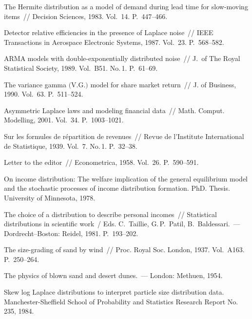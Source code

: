 \begin{multicols}{2}
{{\begin{thebibliography}{99}
The Hermite distribution as a model
of demand during lead time for slow-moving items~// Decision
Sciences, 1983. Vol.~14. P.~447--466.

Detector relative efficiencies in the presence
of Laplace noise~// IEEE Transactions in Aerospace
Electronic Systems, 1987. Vol.~23. P.~568--582.

ARMA models with double-exponentially
distributed noise~// J.\ of The Royal Statistical
Society, 1989. Vol.~B51. No.\,1. P.~61--69.

The variance gamma $($V.G.$)$ model for
share market return~// J. of Business, 1990. Vol.~63. P.~511--524.

Asymmetric Laplace laws and modeling
financial data~// Math. Comput. Modelling, 2001. Vol.~34. P.~1003--1021.

Sur les formules de r{\'e}partition de
revenues~// Revue de l'Institute International de
Statistique, 1939. Vol.~7. No.\,1. P.~32--38.

Letter to the editor~// Econometrica,
1958. Vol.~26. P.~590--591.

On income distribution: The welfare implication of the
general equilibrium model and the stochastic processes of income
distribution formation. PhD. Thesis. University of Minnesota,
1978.

The choice of a distribution to
describe personal incomes~//
Statistical distributions in scientific work~/
Eds. C.~Taillie, G.\,P.~Patil, B.~Baldessari.~---  Dordrecht--Boston: Reidel, 1981. P.~193--202.
 
The size-grading of sand by wind~// Proc. Royal Soc.
London, 1937. Vol.~A163. P.~250--264.

The physics of blown sand and desert dunes.~---
London: Methuen, 1954.

Skew log Laplace
distributions to interpret particle size distribution data.
Manchester-Sheffield School of Probability and Statistics Research
Report No.\,235, 1984.


\end{thebibliography}}}
\end{multicols}
